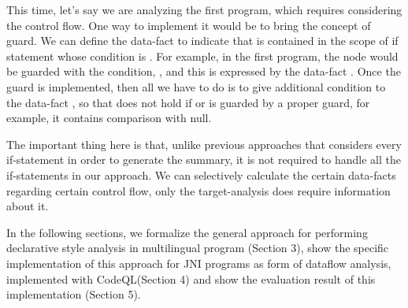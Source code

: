 This time, let's say we are analyzing the first program, which requires
considering the control flow.  One way to implement it would be to bring the
concept of guard. We can define the data-fact  to
indicate that  is contained in the scope of if statement whose
condition is .  For example, in the first program, the
 node would be guarded with the condition, ,
and this is expressed by the data-fact .
Once the guard is implemented, then all we have to do is to give additional
condition to the data-fact , so that  does not
hold if  or  is guarded by a proper guard, for example,
it contains comparison with null.

The important thing here is that, unlike previous approaches that considers
every if-statement in order to generate the summary, it is not required to
handle all the if-statements in our approach. We can selectively calculate the
certain data-facts regarding certain control flow, only the target-analysis
does require information about it.

In the following sections, we formalize the general approach for performing
declarative style analysis in multilingual program (Section 3), show the
specific implementation of this approach for JNI programs as form of dataflow
analysis, implemented with CodeQL(Section 4) and show the evaluation result of
this implementation (Section 5).
